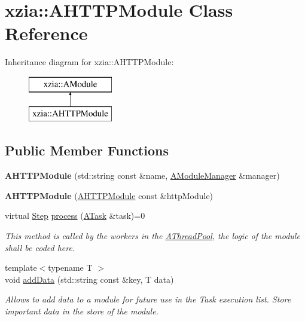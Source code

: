 \hypertarget{classxzia_1_1AHTTPModule}{}\section{xzia\+:\+:A\+H\+T\+T\+P\+Module Class Reference}
\label{classxzia_1_1AHTTPModule}
Inheritance diagram for xzia\+:\+:A\+H\+T\+T\+P\+Module\+:\begin{figure}[H]
\begin{center}
\leavevmode
\includegraphics[height=2.000000cm]{classxzia_1_1AHTTPModule}
\end{center}
\end{figure}
\subsection*{Public Member Functions}
\begin{DoxyCompactItemize}
\item 
\mbox{\label{classxzia_1_1AHTTPModule_abb342531b0bfb055f8d79c8634622e97}} 
{\bfseries A\+H\+T\+T\+P\+Module} (std\+::string const \&name, \mbox{\hyperlink{classxzia_1_1AModuleManager}{A\+Module\+Manager}} \&manager)
\item 
\mbox{\label{classxzia_1_1AHTTPModule_ad2eec7ec7828720f511d204a15c3dc9d}} 
{\bfseries A\+H\+T\+T\+P\+Module} (\mbox{\hyperlink{classxzia_1_1AHTTPModule}{A\+H\+T\+T\+P\+Module}} const \&http\+Module)
\item 
virtual \mbox{\hyperlink{Step_8hpp_a58ad1bb906913f90b95697c49f198770}{Step}} \mbox{\hyperlink{classxzia_1_1AHTTPModule_aec792240cda0e3697184e6271fb3a66b}{process}} (\mbox{\hyperlink{classxzia_1_1ATask}{A\+Task}} \&task)=0
\begin{DoxyCompactList}\small\item\em This method is called by the workers in the \mbox{\hyperlink{classxzia_1_1AThreadPool}{A\+Thread\+Pool}}, the logic of the module shall be coded here. \end{DoxyCompactList}\item 
\mbox{\label{classxzia_1_1AHTTPModule_ad4a892371fa598dcda37ffd2c086e9ab}} 
{\footnotesize template$<$typename T $>$ }\\void \mbox{\hyperlink{classxzia_1_1AHTTPModule_ad4a892371fa598dcda37ffd2c086e9ab}{add\+Data}} (std\+::string const \&key, T data)
\begin{DoxyCompactList}\small\item\em Allows to add data to a module for future use in the Task execution list. Store important data in the store of the module. \end{DoxyCompactList}\end{DoxyCompactItemize}

